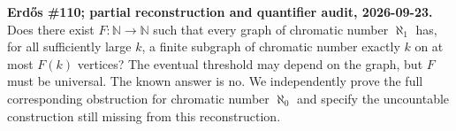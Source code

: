 \textbf{Erd\H{o}s \#110; partial reconstruction and quantifier audit, 2026-09-23.}
Does there exist $F:\mathbb N\to\mathbb N$ such that every graph of chromatic number $\aleph_1$ has, for all sufficiently large $k$, a finite subgraph of chromatic number exactly $k$ on at most $F(k)$ vertices? The eventual threshold may depend on the graph, but $F$ must be universal. The known answer is no. We independently prove the full corresponding obstruction for chromatic number $\aleph_0$ and specify the uncountable construction still missing from this reconstruction.
